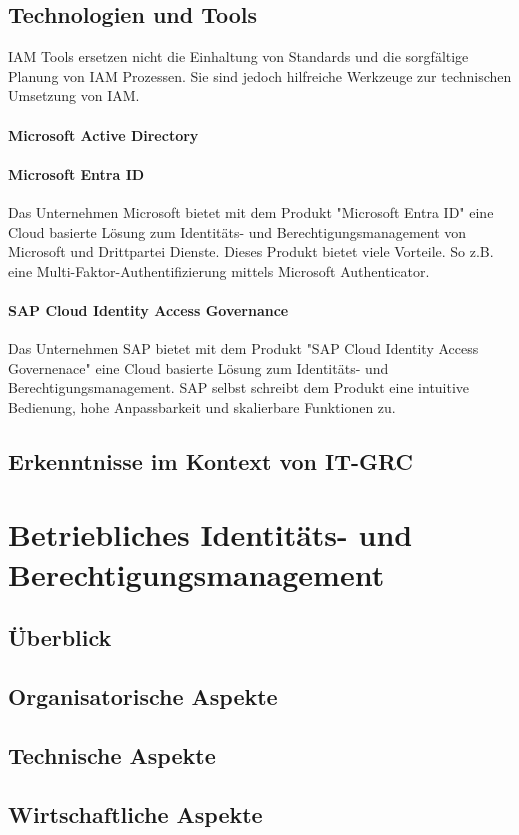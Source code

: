 \documentclass[10pt]{article}
\begin{document}
\subsection{Technologien und Tools}
IAM Tools ersetzen nicht die Einhaltung von Standards und die sorgfältige Planung von IAM Prozessen. Sie sind jedoch hilfreiche Werkzeuge zur technischen Umsetzung von IAM.
\paragraph{Microsoft Active Directory}
\paragraph{Microsoft Entra ID}
Das Unternehmen Microsoft bietet mit dem Produkt "Microsoft Entra ID" eine Cloud basierte Lösung zum Identitäts- und Berechtigungsmanagement von Microsoft und Drittpartei Dienste. Dieses Produkt bietet viele Vorteile. So z.B. eine Multi-Faktor-Authentifizierung mittels Microsoft Authenticator.
\paragraph{SAP Cloud Identity Access Governance}
Das Unternehmen SAP bietet mit dem Produkt "SAP Cloud Identity Access Governenace" eine Cloud basierte Lösung zum Identitäts- und Berechtigungsmanagement. SAP selbst schreibt dem Produkt eine intuitive Bedienung, hohe Anpassbarkeit und skalierbare Funktionen zu.
\subsection{Erkenntnisse im Kontext von IT-GRC}
\section{Betriebliches Identitäts- und Berechtigungsmanagement}
\subsection{Überblick}
\subsection{Organisatorische Aspekte}
\subsection{Technische Aspekte}
\subsection{Wirtschaftliche Aspekte}
\end{document}
